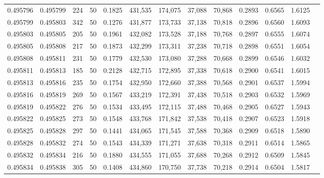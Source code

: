 \begin{tabular}{rrrrrrrrrrrrr}
0.495796 & 0.495799 &   224 &  50 &                                     0.1825 & 431,535 & 174,075 &  37,088 &  70,868 & 0.2893 & 0.6565 & 1.6125 \\
0.495799 & 0.495803 &   342 &  50 &                                     0.1276 & 431,877 & 173,733 &  37,138 &  70,818 & 0.2896 & 0.6560 & 1.6093 \\
0.495803 & 0.495805 &   205 &  50 &                                     0.1961 & 432,082 & 173,528 &  37,188 &  70,768 & 0.2897 & 0.6555 & 1.6074 \\
0.495805 & 0.495808 &   217 &  50 &                                     0.1873 & 432,299 & 173,311 &  37,238 &  70,718 & 0.2898 & 0.6551 & 1.6054 \\
0.495808 & 0.495811 &   231 &  50 &                                     0.1779 & 432,530 & 173,080 &  37,288 &  70,668 & 0.2899 & 0.6546 & 1.6032 \\
0.495811 & 0.495813 &   185 &  50 &                                     0.2128 & 432,715 & 172,895 &  37,338 &  70,618 & 0.2900 & 0.6541 & 1.6015 \\
0.495813 & 0.495816 &   235 &  50 &                                     0.1754 & 432,950 & 172,660 &  37,388 &  70,568 & 0.2901 & 0.6537 & 1.5994 \\
0.495816 & 0.495819 &   269 &  50 &                                     0.1567 & 433,219 & 172,391 &  37,438 &  70,518 & 0.2903 & 0.6532 & 1.5969 \\
0.495819 & 0.495822 &   276 &  50 &                                     0.1534 & 433,495 & 172,115 &  37,488 &  70,468 & 0.2905 & 0.6527 & 1.5943 \\
0.495822 & 0.495825 &   273 &  50 &                                     0.1548 & 433,768 & 171,842 &  37,538 &  70,418 & 0.2907 & 0.6523 & 1.5918 \\
0.495825 & 0.495828 &   297 &  50 &                                     0.1441 & 434,065 & 171,545 &  37,588 &  70,368 & 0.2909 & 0.6518 & 1.5890 \\
0.495828 & 0.495832 &   274 &  50 &                                     0.1543 & 434,339 & 171,271 &  37,638 &  70,318 & 0.2911 & 0.6514 & 1.5865 \\
0.495832 & 0.495834 &   216 &  50 &                                     0.1880 & 434,555 & 171,055 &  37,688 &  70,268 & 0.2912 & 0.6509 & 1.5845 \\
0.495834 & 0.495838 &   305 &  50 &                                     0.1408 & 434,860 & 170,750 &  37,738 &  70,218 & 0.2914 & 0.6504 & 1.5817 \\

\end{tabular}
